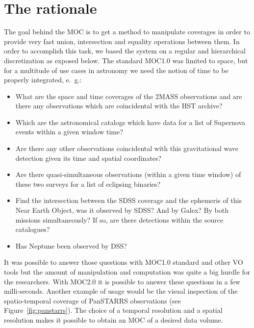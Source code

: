 \documentclass[11pt,a4paper]{ivoa}
\begin{document}
\section{The rationale}
\label{sec:usecases}
The goal behind the MOC is to get a method to manipulate coverages in
order to provide very fast union, intersection and
equality operations between them. In order to accomplish this task, we
based the system on a regular and hierarchical discretization as
exposed below. The standard MOC1.0 was limited to space, but for a
multitude of use cases in astronomy we need the notion of time to be
properly integrated, e.~g.:
\begin{itemize}
\item What are the space and time coverages of the 2MASS observations
  and are there any observations which are coincidental with the HST
  archive?
\item Which are the astronomical catalogs which have data for a list
  of Supernova events within a given window time?
\item Are there any other observations coincidental with this
  gravitational wave detection given its time and spatial coordinates?
\item Are there quasi-simultaneous observations (within a given time
  window) of these two surveys for a list of eclipsing binaries?
\item Find the intersection between the SDSS coverage and the
  ephemeris of this Near Earth Object, was it observed by SDSS? And
  by Galex? By both missions simultaneously? If so, are there
  detections within the source catalogues?
\item Has Neptune been observed by DSS?
\end{itemize}

It was possible to answer those questions with MOC1.0 standard and
other VO tools but the amount of manipulation and computation was
quite a big hurdle for the researchers. With MOC2.0 it is possible
to answer these questions in a few milli-seconds. Another example
of usage would be the visual inspection of the spatio-temporal
coverage of PanSTARRS observations (see Figure~\ref{fig:panstarrs}). 
The choice of a temporal resolution and a spatial resolution makes it
possible to obtain an MOC of a desired data volume. 
\end{document}
